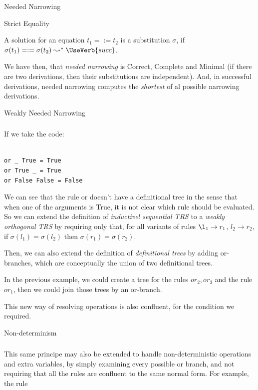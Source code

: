 \documentclass{beamer}
\begin{document}
\begin{section}{Needed Narrowing}
\begin{subsection}{Strict Equality}
\begin{frame}[fragile]

A solution for an equation $t_1 =:= t_2$ is a substitution $\sigma$, if $\sigma(t_1) =:= \sigma(t_2) \leadsto^* \UseVerb{succ}$.

We have then, that \textit{needed narrowing} is Correct, Complete and Minimal (if there are two derivations, then their substitutions are independent). And, in successful derivations, needed narrowing computes the \textit{shortest} of al possible narrowing derivations.

\end{frame}
\end{subsection}

\begin{subsection}{Weakly Needed Narrowing}

\begin{frame}[fragile]
\frametitle{\subsecname}
  If we take the code:
\begin{verbatim}

or _ True = True
or True _ = True
or False False = False

\end{verbatim}

  We can see that the rule or doesn't have a definitional tree in the sense that when one of the arguments is True, it is not clear which rule should be evaluated. So we can extend the definition of \textit{inductivel sequential TRS} to a \textit{weakly orthogonal TRS} by requiring only that, for all variants of rules $\l_1 \rightarrow r_1$, $l_2 \rightarrow r_2$, if $\sigma(l_1) = \sigma(l_2)$ then $\sigma(r_1) = \sigma(r_2)$.

\end{frame}

\begin{frame}
  Then, we can also extend the definition of \textit{definitional trees} by adding or-branches, which are conceptually the union of two definitional trees.

  In the previous example, we could create a tree for the rules {$or_2,or_3$} and the rule {$or_1$}, then we could join those trees by an or-branch.

  This new way of resolving operations is also confluent, for the condition we required.

  \end{frame}
\end{subsection}

\begin{subsection}{Non-determinism}
\begin{frame}[fragile]
\frametitle{\subsecname}
  This same principe may also be extended to handle non-deterministic operations and extra variables, by simply examining every possible or branch, and not requiring that all the rules are confluent to the same normal form. For example, the rule


\end{frame}
\end{subsection}
\end{section}
\end{document}
